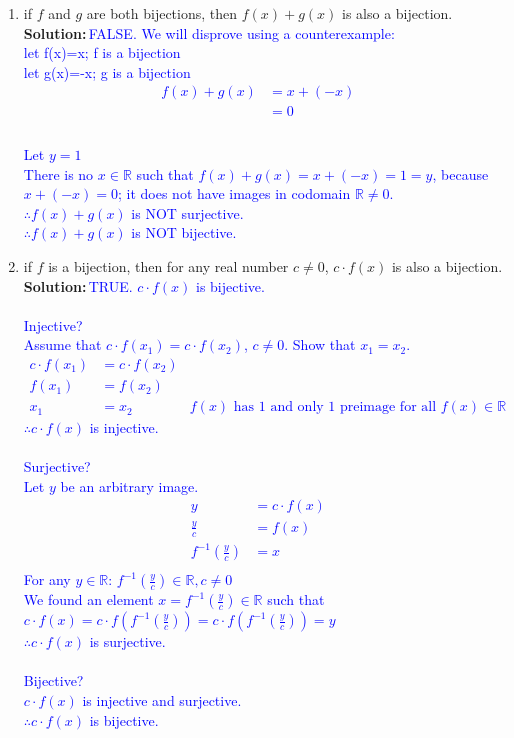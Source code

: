 \documentclass{article}
\newcommand{\sol}[1]{\textbf{Solution:\,}\textcolor{blue}{#1}}
\begin{document}
\begin{enumerate}
\begin{enumerate}
\item if $f$ and $g$ are both bijections, then $f(x)+g(x)$ is also a bijection. 
\\\sol{FALSE. We will disprove using a counterexample:
\\let f(x)=x; f is a bijection
\\let g(x)=-x; g is a bijection
\begin{align*}
f(x)+g(x)
&=x+(-x)\\
&=0&\text{}\\
\end{align*}
\\Let $y=1$
\\There is no $x\in\mathbb{R}$ such that $f(x)+g(x)=x+(-x)=1=y$, because $x+(-x)=0$; it does not have images in codomain $\mathbb{R}\neq0$.
\\$\therefore f(x)+g(x)$ is NOT surjective.
\\$\therefore f(x)+g(x)$ is NOT bijective.
}
\item if $f$ is a bijection, then for any real number $c \neq 0$, $c \cdot f(x)$ is also a bijection.
\\\sol{TRUE. $c\cdot f(x)$ is bijective.
\\\\Injective?
\\Assume that $c\cdot f(x_1)=c\cdot f(x_2)$, $c\neq 0$. Show that $x_1=x_2$.
\begin{align*}
c\cdot f(x_1)&=c\cdot f(x_2)&\text{}\\
f(x_1)&=f(x_2)&\text{}\\
x_1&=x_2&\text{$f(x)$ has 1 and only 1 preimage for all $f(x)\in\mathbb{R}$}
\end{align*}
$\therefore c\cdot f(x)$ is injective.
\\\\Surjective?
\\Let $y$ be an arbitrary image.
\begin{align*}
y&=c\cdot f(x)&\text{}\\
\frac{y}{c}&=f(x)&\text{}\\
f^{-1}(\frac{y}{c})&=x&\text{}\\
\end{align*}
For any $y\in\mathbb{R}$: $f^{-1}(\frac{y}{c})\in\mathbb{R}, c\neq 0$
\\We found an element $x=f^{-1}(\frac{y}{c})\in\mathbb{R}$ such that $c\cdot f(x)=c\cdot f(f^{-1}(\frac{y}{c}))=c\cdot f(f^{-1}(\frac{y}{c}))=y$
\\$\therefore c\cdot f(x)$ is surjective.
\\\\Bijective?
\\$c\cdot f(x)$ is injective and surjective.
\\$\therefore c\cdot f(x)$ is bijective.
}
\end{enumerate}
 
\end{enumerate}
\end{document}
